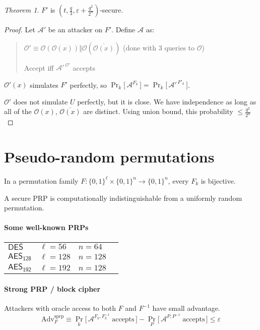 \documentclass[11pt]{article}
\newcommand{\eqdef}{\ensuremath{\equiv}}
\newcommand{\eps}{\ensuremath{\varepsilon}}
\theoremstyle{remark}
\newtheorem{thm}{Theorem}
\begin{document}
\begin{thm}
$F'$ is $\displaystyle (t, \frac{q}{3}, \eps + \frac{q^2}{2^n})$-secure.
\begin{proof}
Let $\mathcal{A}'$ be an attacker on $F'$.
Define $\mathcal{A}$ as:
\begin{quote}
$\mathcal{O}' \eqdef
\mathcal{O}(\mathcal{O}(x)) \Vert \mathcal{O}(\overline{\mathcal{O}(x)})$
(done with $3$ queries to $\mathcal{O}$)

Accept iff $\mathcal{A}'^{\,\mathcal{O}'}$ accepts
\end{quote}
$\mathcal{O}'(x)$ simulates $F'$ perfectly, so
$\displaystyle
\Pr_k \big[\, \mathcal{A}^{F_k} \,\big] =
\Pr_k \big[\, \mathcal{A'}^{\,F'_k} \,\big]$.

$\mathcal{O}'$ does not simulate $U$ perfectly, but it is close.
We have independence as long as all of the
$\mathcal{O}(x)$, $\overline{\mathcal{O}(x)}$ are distinct.
Using union bound, this probability $\le \frac{q^2}{2^n}$
\end{proof}
\end{thm}

\section{Pseudo-random permutations}

In a permutation family
$F : \{0,1\}^\ell \times \{0,1\}^n \rightarrow \{0,1\}^n$,
every $F_k$ is bijective.

A secure PRP is computationally indistinguishable from
a uniformly random permutation.

\paragraph{Some well-known PRPs}
\begin{tabular}{l|lll}
$\mathsf{DES}$ & $\ell = 56$ & $n = 64$ \\
$\mathsf{AES_{128}}$ & $\ell = 128$ & $n = 128$ \\
$\mathsf{AES_{192}}$ & $\ell = 192$ & $n = 128$
\end{tabular}

\paragraph{Strong PRP / block cipher}
Attackers with oracle access to both $F$ and $F^{-1}$
have small advantage. \[
\text{Adv}_F^\text{sprp} \eqdef
  \Pr_k \big[\, \mathcal{A}^{F_k,F_k^{-1}} \; \text{accepts} \,\big]
- \Pr_P \big[\, \mathcal{A}^{P,P^{-1}} \; \text{accepts} \,\big]
\le \eps
\]
\end{document}
